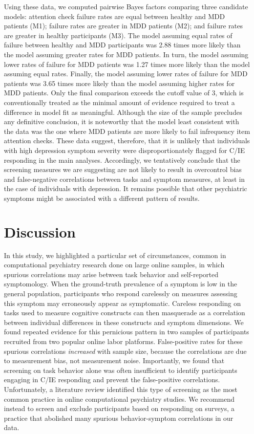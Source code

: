 \documentclass[a4paper,notitlepage,12pt]{article}
\begin{document}
Using these data, we computed pairwise Bayes factors comparing three candidate models: attention check failure rates are equal between healthy and MDD patients (M1); failure rates are greater in MDD patients (M2); and failure rates are greater in healthy participants (M3). The model assuming equal rates of failure between healthy and MDD participants was 2.88 times more likely than the model assuming greater rates for MDD patients. In turn, the model assuming lower rates of failure for MDD patients was 1.27 times more likely than the model assuming equal rates. Finally, the model assuming lower rates of failure for MDD patients was 3.65 times more likely than the model assuming higher rates for MDD patients. Only the final comparison exceeds the cutoff value of 3, which is conventionally treated as the minimal amount of evidence required to treat a difference in model fit as meaningful. Although the size of the sample precludes any definitive conclusion, it is noteworthy that the model least consistent with the data was the one where MDD patients are more likely to fail infrequency item attention checks. These data suggest, therefore, that it is unlikely that individuals with high depression symptom severity were disproportionately flagged for C/IE responding in the main analyses. Accordingly, we tentatively conclude that the screening measures we are suggesting are not likely to result in overcontrol bias and false-negative correlations between tasks and symptom measures, at least in the case of individuals with depression. It remains possible that other psychiatric symptoms might be associated with a different pattern of results.

\section*{Discussion}

In this study, we highlighted a particular set of circumstances, common in computational psychiatry research done on large online samples, in which spurious correlations may arise between task behavior and self-reported symptomology. When the ground-truth prevalence of a symptom is low in the general population, participants who respond carelessly on measures assessing this symptom may erroneously appear as symptomatic. Careless responding on tasks used to measure cognitive constructs can then masquerade as a correlation between individual differences in these constructs and symptom dimensions. We found repeated evidence for this pernicious pattern in two samples of participants recruited from two popular online labor platforms. False-positive rates for these spurious correlations \emph{increased} with sample size, because the correlations are due to measurement bias, not measurement noise. Importantly, we found that screening on task behavior alone was often insufficient to identify participants engaging in C/IE responding and prevent the false-positive correlations. Unfortunately, a literature review identified this type of screening as the most common practice in online computational psychiatry studies. We recommend instead to screen and exclude participants based on responding on surveys, a practice that abolished many spurious behavior-symptom correlations in our data. 
\end{document}

